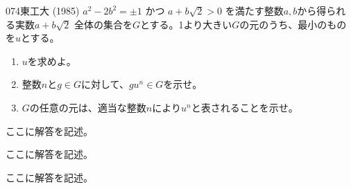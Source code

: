 \begin{thm}{074}{\maru}{東工大 (1985)}
 $a^2-2b^2=\pm 1$ かつ $a+b\sqrt{2}>0$ を満たす整数$a, b$から得られる実数$a+b\sqrt{2}$ 全体の集合を$G$とする。1より大きい$G$の元のうち、最小のものを$u$とする。
 \begin{enumerate}
  \item $u$を求めよ。
  \item 整数$n$と$g\in G$に対して、$gu^n\in G$を示せ。
  \item $G$の任意の元は、適当な整数$n$により$u^n$と表されることを示せ。
 \end{enumerate}
\end{thm}

ここに解答を記述。

ここに解答を記述。

ここに解答を記述。